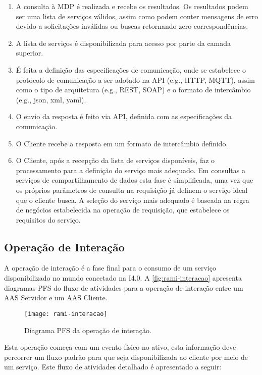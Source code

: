 	\begin{enumerate}
		\item A consulta à MDP é realizada e recebe os resultados. Os resultados podem ser uma lista de serviços válidos, assim como podem conter mensagens de erro devido a solicitações inválidas ou buscas retornando zero correspondências.
		\item A lista de serviços é disponibilizada para acesso por parte da camada superior.
		\item É feita a definição das especificações de comunicação, onde se estabelece o protocolo de comunicação a ser adotado na API (e.g., HTTP, MQTT), assim como o tipo de arquitetura (e.g., REST, SOAP) e o formato de intercâmbio (e.g., json, xml, yaml).
		\item O envio da resposta é feito via API, definida com as especificações da comunicação.
		\item O Cliente recebe a resposta em um formato de intercâmbio definido.
		\item O Cliente, após a recepção da lista de serviços disponíveis, faz o processamento para a definição do serviço mais adequado. Em consultas a serviços de compartilhamento de dados esta fase é simplificada, uma vez que os próprios parâmetros de consulta na requisição já definem o serviço ideal que o cliente busca. A seleção do serviço mais adequado é baseada na regra de negócios estabelecida na operação de requisição, que estabelece os requisitos do serviço.
	\end{enumerate}

\subsection{Operação de Interação}

	A operação de interação é a fase final para o consumo de um serviço disponibilizado no mundo conectado na I4.0. A \autoref{fig:rami-interacao} apresenta diagramas PFS do fluxo de atividades para a operação de interação entre um AAS Servidor e um AAS Cliente.
	
	\begin{figure}[htb]
		\centering
		\caption{Diagrama PFS da operação de interação.}
		\label{fig:rami-interacao}
		\texttt{[image: rami-interacao]}
	\end{figure}

	Esta operação começa com um evento físico no ativo, esta informação deve percorrer um fluxo padrão para que seja disponibilizada ao cliente por meio de um serviço. Este fluxo de atividades detalhado é apresentado a seguir:
	
